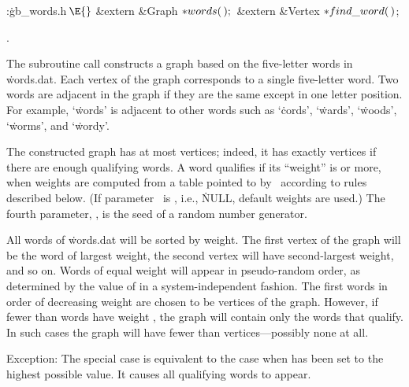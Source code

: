 \Y\B\4:\.{gb\_words.h\,}\X${}\E{}$\6
\&{extern} \&{Graph} ${}{*}\\{words}(\,);{}$\6
\&{extern} \&{Vertex} ${}{*}\\{find\_word}(\,){}$;\par
{}.\fi

The subroutine call 
constructs a graph based on the five-letter words in \.{words.dat}.
Each vertex of the graph corresponds to a single five-letter word. Two
words are adjacent in the graph if they are the same except in one
letter position. For example, `\.{words}' is adjacent to other words such as
`\.{cords}', `\.{wards}', `\.{woods}', `\.{worms}', and `\.{wordy}'.

The constructed graph has at most  vertices; indeed, it has exactly
 vertices if there are enough qualifying words. A word qualifies
if its ``weight'' is  or more, when weights are
computed from a table pointed to by~ according to rules
described below. (If parameter~
is \PB{$\NULL$}, i.e., \.{NULL}, default weights are used.) The fourth
parameter,
, is the seed of a random number generator.

All words of \.{words.dat} will be sorted by weight. The first vertex of
the graph will be the word of largest
weight, the second vertex will have second-largest weight, and so on.
Words of equal weight will appear in pseudo-random order, as determined
by the value of  in a system-independent fashion.
The first  words in order of decreasing weight are chosen to be
vertices of the graph. However, if fewer than  words have weight , the graph will contain only the words that qualify. In
such cases the graph will have fewer than  vertices---possibly none at
all.

Exception: The special case  is equivalent to the case when %
has been set to the highest possible value. It causes all qualifying
words to appear.

